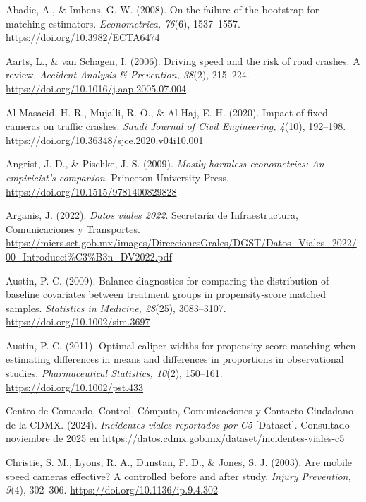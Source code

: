 \begin{thebibliography}{}

Abadie, A., \& Imbens, G. W. (2008). On the failure of the bootstrap for matching estimators. \textit{Econometrica, 76}(6), 1537–1557. \url{https://doi.org/10.3982/ECTA6474}

Aarts, L., \& van Schagen, I. (2006). Driving speed and the risk of road crashes: A review. \textit{Accident Analysis \& Prevention, 38}(2), 215–224. \url{https://doi.org/10.1016/j.aap.2005.07.004}

Al-Masaeid, H. R., Mujalli, R. O., \& Al-Haj, E. H. (2020). Impact of fixed cameras on traffic crashes. \textit{Saudi Journal of Civil Engineering, 4}(10), 192–198. \url{https://doi.org/10.36348/sjce.2020.v04i10.001}

Angrist, J. D., \& Pischke, J.-S. (2009). \textit{Mostly harmless econometrics: An empiricist's companion}. Princeton University Press. \url{https://doi.org/10.1515/9781400829828}

Arganis, J. (2022). \textit{Datos viales 2022}. Secretaría de Infraestructura, Comunicaciones y Transportes. \url{https://micrs.sct.gob.mx/images/DireccionesGrales/DGST/Datos_Viales_2022/00_Introducci%C3%B3n_DV2022.pdf}

Austin, P. C. (2009). Balance diagnostics for comparing the distribution of baseline covariates between treatment groups in propensity-score matched samples. \textit{Statistics in Medicine, 28}(25), 3083–3107. \url{https://doi.org/10.1002/sim.3697}

Austin, P. C. (2011). Optimal caliper widths for propensity-score matching when estimating differences in means and differences in proportions in observational studies. \textit{Pharmaceutical Statistics, 10}(2), 150–161. \url{https://doi.org/10.1002/pst.433}

Centro de Comando, Control, Cómputo, Comunicaciones y Contacto Ciudadano de la CDMX. (2024). \textit{Incidentes viales reportados por C5} [Dataset]. Consultado noviembre de 2025 en \url{https://datos.cdmx.gob.mx/dataset/incidentes-viales-c5}

Christie, S. M., Lyons, R. A., Dunstan, F. D., \& Jones, S. J. (2003). Are mobile speed cameras effective? A controlled before and after study. \textit{Injury Prevention, 9}(4), 302–306. \url{https://doi.org/10.1136/ip.9.4.302}


\end{thebibliography}

